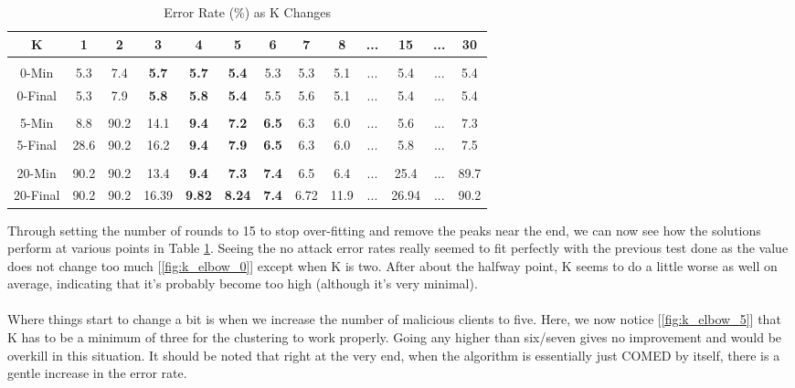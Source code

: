 \begin{center}
    \begin{longtable}{ |c|c|c|c|c|c|c|c|c|c|c|c|c| }
    \caption{Error Rate (\%) as K Changes}
    \label{tbl:k_error_rate}
    \hline
    K & 1 & 2 & 3 & 4 & 5 & 6 & 7 & 8 & ... & 15 & ... & 30 \\ \hline
    \multicolumn{13}{|c|}{} \\ \hline
    0-Min & 5.3 & 7.4 & \textbf{5.7}	& \textbf{5.7}	& \textbf{5.4}	& 5.3	& 5.3	& 5.1 & ...	& 5.4 & ... & 5.4 \\ \hline
    0-Final & 5.3	& 7.9	& \textbf{5.8}	& \textbf{5.8}	& \textbf{5.4}	& 5.5	& 5.6	& 5.1 & ...	& 5.4 & ...  & 5.4 \\ \hline
    \multicolumn{13}{|c|}{} \\ \hline
    5-Min & 8.8 &	90.2 &	14.1 &	\textbf{9.4} &	\textbf{7.2} &	\textbf{6.5} &	6.3 &	6.0 & ... &	5.6 & ...  & 7.3 \\ \hline
    5-Final & 28.6	& 90.2	& 16.2	& \textbf{9.4}	& \textbf{7.9}	& \textbf{6.5}	& 6.3	& 6.0 & ...	& 5.8 & ...  & 7.5 \\ \hline
    \multicolumn{13}{|c|}{} \\ \hline
    20-Min & 90.2	& 90.2	& 13.4	& \textbf{9.4}	& \textbf{7.3}	& \textbf{7.4}	& 6.5	& 6.4 & ...	& 25.4 & ...  & 89.7 \\ \hline
    20-Final & 90.2	& 90.2	& 16.39	& \textbf{9.82}	& \textbf{8.24}	& \textbf{7.4}	& 6.72	& 11.9	& ...	& 26.94 & ...  & 90.2 \\ \hline
    \end{longtable}
\end{center}
Through setting the number of rounds to 15 to stop over-fitting and remove the peaks near the end, we can now see how the solutions perform at various points in Table \ref{tbl:k_error_rate}.
Seeing the no attack error rates really seemed to fit perfectly with the previous test done as the value does not change too much [\ref{fig:k_elbow_0}] except when K is two.
After about the halfway point, K seems to do a little worse as well on average, indicating that it's probably become too high (although it's very minimal).
\\ \\
Where things start to change a bit is when we increase the number of malicious clients to five.
Here, we now notice [\ref{fig:k_elbow_5}] that K has to be a minimum of three for the clustering to work properly.
Going any higher than six/seven gives no improvement and would be overkill in this situation.
It should be noted that right at the very end, when the algorithm is essentially just COMED by itself, there is a gentle increase in the error rate.

